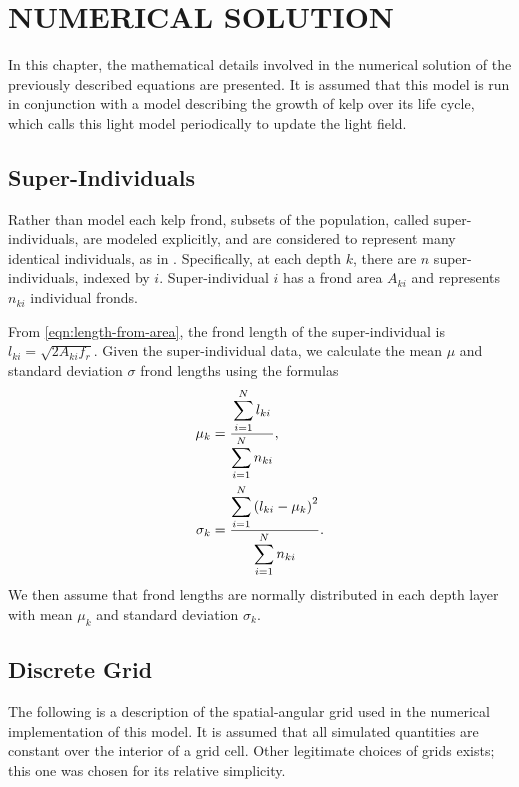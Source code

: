 \chapter{NUMERICAL SOLUTION}
\label{chap:numerical}

In this chapter, the mathematical details involved in the numerical solution of the previously described equations are presented.
It is assumed that this model is run in conjunction with a model describing the growth of kelp over its life cycle, which calls this light model periodically to update the light field.

\section{Super-Individuals}
\label{sec:si}

Rather than model each kelp frond, subsets of the population, called super-individuals, are modeled explicitly, and are considered to represent many identical individuals, as in \citep{scheffer_super-individuals_1994}.
Specifically, at each depth $k$, there are $n$ super-individuals, indexed by $i$.
Super-individual $i$ has a frond area $A_{ki}$ and represents $n_{ki}$ individual fronds.

From \eqref{eqn:length-from-area}, the frond length of the super-individual is $l_{ki} = \sqrt{2A_{ki}f_r}$.
Given the super-individual data, we calculate the mean $\mu$ and standard deviation $\sigma$ frond
lengths using the formulas
\begin{align}
  \mu_k &= \frac{\displaystyle \sum_{i=1}^N l_{ki}}{\displaystyle \sum_{i=1}^N n_{ki}},
  \label{eqn:si_mean} \\
  \sigma_k &= \frac{\displaystyle \sum_{i=1}^N \left( l_{ki} - \mu_k \right)^2}{\displaystyle \sum_{i=1}^N n_{ki}}.
  \label{eqn:si_std}
\end{align}
We then assume that frond lengths are normally distributed in each depth layer
with mean $\mu_k$ and standard deviation $\sigma_k$.

\section{Discrete Grid}
\label{sec:grid}

The following is a description of the spatial-angular grid used in the numerical implementation of this model.
It is assumed that all simulated quantities are constant over the interior of a grid cell.
Other legitimate choices of grids exists; this one was chosen for its relative simplicity.

